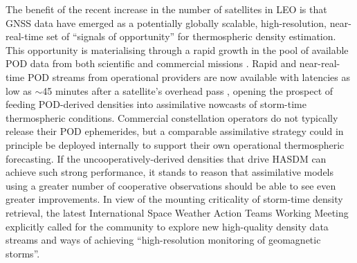\documentclass{agujournal2019}
\begin{document}
The benefit of the recent increase in the number of satellites in LEO is that GNSS data have emerged as a potentially globally scalable, high-resolution, near-real-time set of “signals of opportunity” for thermospheric density estimation. This opportunity is materialising through a rapid growth in the pool of available POD data from both scientific and commercial missions \cite{Arnold2023PreciseSatellites, Schreiner2022GFZProducts, Mutschler2023Physics-BasedData, Fitzpatrick2024ApplyingSatellite}. Rapid and near-real-time POD streams from operational providers are now available with latencies as low as $\sim$45 minutes after a satellite's overhead pass \cite{Schreiner2022GFZProducts}, opening the prospect of feeding POD-derived densities into assimilative nowcasts of storm-time thermospheric conditions. Commercial constellation operators do not typically release their POD ephemerides, but a comparable assimilative strategy could in principle be deployed internally to support their own operational thermospheric forecasting.
If the uncooperatively-derived densities that drive HASDM can achieve such strong performance, it stands to reason that assimilative models using a greater number of cooperative observations should be able to see even greater improvements. In view of the mounting criticality of storm-time density retrieval, the latest International Space Weather Action Teams Working Meeting \cite{Mehta2022SatelliteOperations} explicitly called for the community to explore new high-quality density data streams and ways of achieving “high-resolution monitoring of geomagnetic storms”. 
\end{document}
